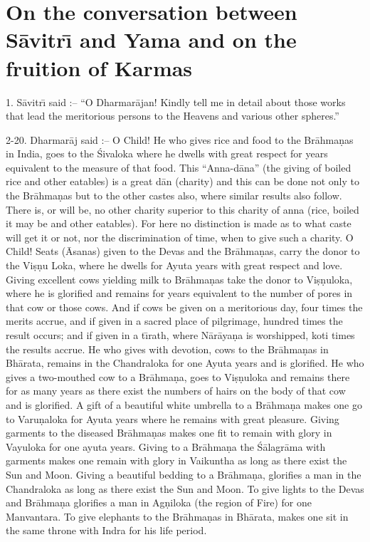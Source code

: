 \chapter{On the conversation between S\=avitr\={\i} and Yama and on the fruition of Karmas}

1. S\=avitr\={\i} said :-- ``O Dharmar\=ajan! Kindly tell me in detail about those works that lead the meritorious persons to the Heavens and various other spheres.''

2-20. Dharmar\=aj said :-- O Child! He who gives rice and food to the Br\=ahma\d{n}as in India, goes to the \'Sivaloka where he dwells with great respect for years equivalent to the measure of that food. This ``Anna-d\=ana'' (the giving of boiled rice and other eatables) is a great d\=an (charity) and this can be done not only to the Br\=ahma\d{n}as but to the other castes also, where similar results also follow. There is, or will be, no other charity superior to this charity of anna (rice, boiled it may be and other eatables). For here no distinction is made as to what caste will get it or not, nor the discrimination of time, when to give such a charity. O Child! Seats (\=Asanas) given to the Devas and the Br\=ahma\d{n}as, carry the donor to the Vi\d{s}\d{n}u Loka, where he dwells for Ayuta years with great respect and love. Giving excellent cows yielding milk to Br\=ahma\d{n}as take the donor to Vi\d{s}\d{n}uloka, where he is glorified and remains for years equivalent to the number of pores in that cow or those cows. And if cows be given on a meritorious day, four times the merits accrue, and if given in a sacred place of pilgrimage, hundred times the result occurs; and if given in a t\={\i}rath, where N\=ar\=aya\d{n}a is worshipped, koti times the results accrue. He who gives with devotion, cows to the Br\=ahma\d{n}as in Bh\=arata, remains in the Chandraloka for one Ayuta years and is glorified. He who gives a two-mouthed cow to a Br\=ahma\d{n}a, goes to Vi\d{s}\d{n}uloka and remains there for as many years as there exist the numbers of hairs on the body of that cow and is glorified. A gift of a beautiful white umbrella to a Br\=ahma\d{n}a makes one go to Varu\d{n}aloka for Ayuta years where he remains with great pleasure. Giving garments to the diseased Br\=ahma\d{n}as makes one fit to remain with glory in Vayuloka for one ayuta years. Giving to a Br\=ahma\d{n}a the \'S\=alagr\=ama with garments makes one remain with glory in Vaikuntha as long as there exist the Sun and Moon. Giving a beautiful bedding to a Br\=ahma\d{n}a, glorifies a man in the Chandraloka as long as there exist the Sun and Moon. To give lights to the Devas and Br\=ahma\d{n}a glorifies a man in Ag\d{n}iloka (the region of Fire) for one Manvantara. To give elephants to the Br\=ahma\d{n}as in Bh\=arata, makes one sit in the same throne with Indra for his life period.

